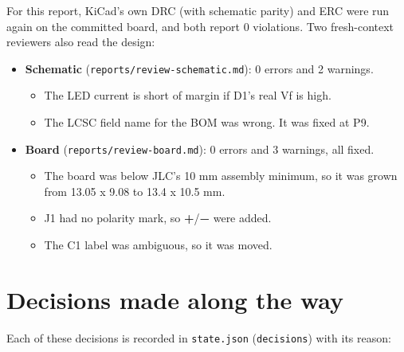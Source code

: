 \documentclass[
  10pt,
]{article}
\providecommand{\tightlist}{%
  \setlength{\itemsep}{0pt}\setlength{\parskip}{0pt}}
\begin{document}
For this report, KiCad's own DRC (with schematic parity) and ERC were
run again on the committed board, and both report 0 violations. Two
fresh-context reviewers also read the design:

\begin{itemize}
\tightlist
\item
  \textbf{Schematic} (\texttt{reports/review-schematic.md}): 0 errors
  and 2 warnings.

  \begin{itemize}
  \tightlist
  \item
    The LED current is short of margin if D1's real Vf is high.
  \item
    The LCSC field name for the BOM was wrong. It was fixed at P9.
  \end{itemize}
\item
  \textbf{Board} (\texttt{reports/review-board.md}): 0 errors and 3
  warnings, all fixed.

  \begin{itemize}
  \tightlist
  \item
    The board was below JLC's 10 mm assembly minimum, so it was grown
    from 13.05 x 9.08 to 13.4 x 10.5 mm.
  \item
    J1 had no polarity mark, so \textbf{+}/\textbf{−} were added.
  \item
    The C1 label was ambiguous, so it was moved.
  \end{itemize}
\end{itemize}

\section{Decisions made along the
way}\label{decisions-made-along-the-way}

Each of these decisions is recorded in \texttt{state.json}
(\texttt{decisions}) with its reason:
\end{document}

